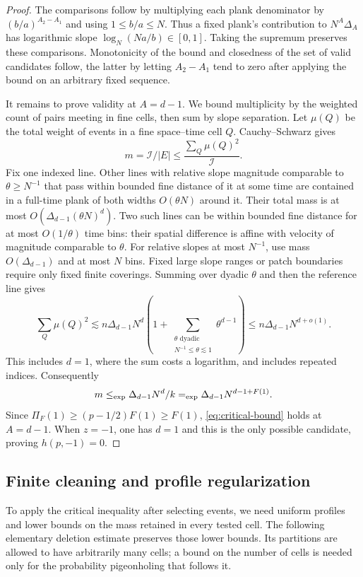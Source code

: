 \begin{proof}
The comparisons follow by multiplying each plank denominator by
$(b/a)^{A_2-A_1}$ and using $1\le b/a\le N$.  Thus a fixed plank's
contribution to $N^A\Delta_A$ has logarithmic slope
$\log_N(Na/b)\in[0,1]$.  Taking the supremum preserves these comparisons.
Monotonicity of the bound and closedness of the set of valid candidates
follow, the latter by letting $A_2-A_1$ tend to zero after applying the bound
on an arbitrary fixed sequence.

It remains to prove validity at $A=d-1$. We bound multiplicity by the
weighted count of pairs meeting in fine cells, then sum by slope separation.
Let $\mu(Q)$ be the total weight
of events in a fine space--time cell $Q$.  Cauchy--Schwarz gives
\[
 m=\mathcal I/|E|\le
 \frac{\sum_Q\mu(Q)^2}{\mathcal I}.
\]
Fix one indexed line.  Other lines with relative slope magnitude comparable
to $\theta\ge N^{-1}$ that pass within bounded fine distance of it at some
time are contained in a full-time plank of both widths $O(\theta N)$
around it.  Their total mass is at most
$O(\Delta_{d-1}(\theta N)^d)$.  Two such lines can be within bounded fine
distance for at most $O(1/\theta)$ time bins: their spatial difference is
affine with velocity of magnitude comparable to $\theta$.  For relative
slopes at most $N^{-1}$, use mass $O(\Delta_{d-1})$ and at most $N$ bins.
Fixed large slope ranges or patch boundaries require only fixed finite
coverings.  Summing over dyadic $\theta$ and then the reference line gives
\[
 \sum_Q\mu(Q)^2
 \lesssim n\Delta_{d-1}N^d
       \left(1+\sum_{\substack{\theta\text{ dyadic}\\N^{-1}\le\theta\lesssim1}}
                              \theta^{d-1}\right)
 \le n\Delta_{d-1}N^{d+o(1)}.
\]
This includes $d=1$, where the sum costs a logarithm, and includes repeated
indices.  Consequently
\[
 m\mathrel{\leq_{\mathrm{exp}}}\Delta_{d-1}N^d/k
 \mathrel{=_{\mathrm{exp}}}\Delta_{d-1}N^{d-1+F(1)}.
\]
Since $\Pi_F(1)\ge(p-1/2)F(1)\ge F(1)$,
\eqref{eq:critical-bound} holds at $A=d-1$.  When $z=-1$, one has $d=1$
and this is the only possible candidate, proving $h(p,-1)=0$.
\end{proof}

\subsection{Finite cleaning and profile regularization}

To apply the critical inequality after selecting events, we need uniform
profiles and lower bounds on the mass retained in every tested cell.
The following elementary deletion estimate preserves those lower bounds.
Its partitions are allowed to have arbitrarily many cells; a bound on the number of cells is needed only for the probability
pigeonholing that follows it.

